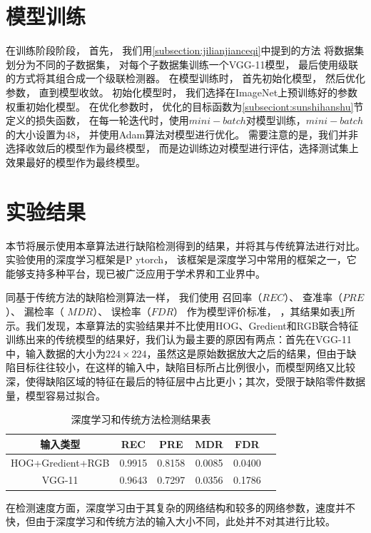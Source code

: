 \section{模型训练}

在训练阶段阶段，
首先，
我们用\ref{subsection:jilianjianceqi}中提到的方法
将数据集划分为不同的子数据集，
对每个子数据集训练一个VGG-11模型，
最后使用级联的方式将其组合成一个级联检测器。
在模型训练时，
首先初始化模型，
然后优化参数，
直到模型收敛。
初始化模型时，
我们选择在ImageNet上预训练好的参数权重初始化模型。
在优化参数时，
优化的目标函数为\ref{subseciont:sunshihanshu}节定义的损失函数，
在每一轮迭代时，使用$mini-batch$对模型训练，$mini-batch$的大小设置为48，
并使用Adam算法对模型进行优化。
需要注意的是，我们并非选择收敛后的模型作为最终模型，
而是边训练边对模型进行评估，选择测试集上效果最好的模型作为最终模型。


\section{实验结果}

本节将展示使用本章算法进行缺陷检测得到的结果，并将其与传统算法进行对比。
实验使用的深度学习框架是P	ytorch，
该框架是深度学习中常用的框架之一，它能够支持多种平台，现已被广泛应用于学术界和工业界中。

同基于传统方法的缺陷检测算法一样，
我们使用
召回率（$REC$）、
查准率（$PRE$）、
漏检率（ $MDR$）、
误检率（$FDR$）
作为模型评价标准，
，其结果如表\ref{tab:shenduxuexijieguo}所示。我们发现，本章算法的实验结果并不比使用HOG、Gredient和RGB联合特征训练出来的传统模型的结果好，我们认为最主要的原因有两点：首先在VGG-11中，输入数据的大小为$224\times 224$，虽然这是原始数据放大之后的结果，但由于缺陷目标往往较小，在这样的输入中，缺陷目标所占比例很小，而模型网络又比较深，使得缺陷区域的特征在最后的特征层中占比更小；其次，受限于缺陷零件数据量，模型容易过拟合。
\begin{table}
\centering
\begin{tabular}{cccccp{38mm}}
\toprule
\textbf{输入类型} & \textbf{REC} & \textbf{PRE} & \textbf{MDR} & \textbf{FDR}\\
\midrule
\mbox{HOG+Gredient+RGB} & 0.9915 & 0.8158 & 0.0085 & 0.0400\\
\mbox{VGG-11} & 0.9643 & 0.7297 & 0.0356 & 0.1786\\
\bottomrule
\end{tabular}
\caption{深度学习和传统方法检测结果表}
\label{tab:shenduxuexijieguo}
\end{table}

在检测速度方面，深度学习由于其复杂的网络结构和较多的网络参数，速度并不快，但由于深度学习和传统方法的输入大小不同，此处并不对其进行比较。
